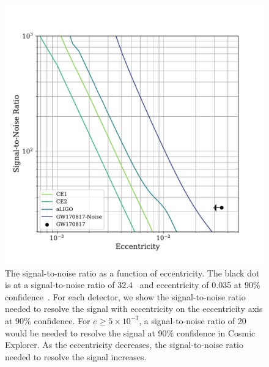 \begin{figure}
    \includegraphics[width=1.1\columnwidth]{Figures/3G-bns-search-prospects/SNR_20.pdf}
    \caption{The signal-to-noise ratio as a function of eccentricity. The black dot is at a signal-to-noise ratio of $32.4$~\cite{TheLIGOScientific:2017qsa} and eccentricity of 0.035 at 90\% confidence~\cite{Lenon:2020oza}. For each detector, we show the signal-to-noise ratio needed to resolve the signal with eccentricity on the eccentricity axis at 90\% confidence. For $e \geq 5\times 10^{-3}$, a signal-to-noise ratio of 20 would be needed to resolve the signal at 90\% confidence in Cosmic Explorer. As the eccentricity decreases, the signal-to-noise ratio needed to resolve the signal increases.}
\label{Fig:SNRvEccen}
\end{figure}